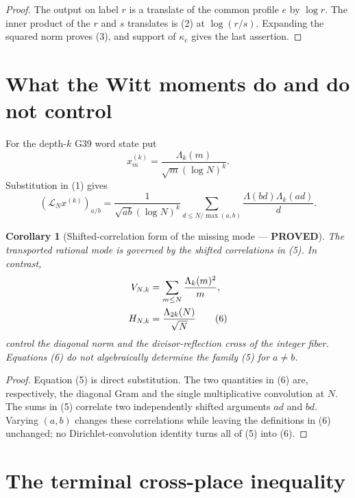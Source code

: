 \documentclass[11pt]{article}
\newcommand{\PROVED}{\textcolor{green!40!black}{\textbf{PROVED}}}
\newtheorem{corollary}{Corollary}
\begin{document}
\begin{proof}
The output on label $r$ is a translate of the common profile $e$ by
$\log r$.  The inner product of the $r$ and $s$ translates is (2) at
$\log(r/s)$.  Expanding the squared norm proves (3), and support of
$\kappa_e$ gives the last assertion.
\end{proof}

\section{What the Witt moments do and do not control}

For the depth-$k$ G39 word state put
\begin{equation}
 x_m^{(k)}=
 \frac{\Lambda_k(m)}{\sqrt m(\log N)^k}.                     \tag{4}
\end{equation}
Substitution in (1) gives
\begin{equation}
 \boxed{
 (\mathcal L_Nx^{(k)})_{a/b}
 =\frac1{\sqrt{ab}(\log N)^k}
 \sum_{d\le N/\max(a,b)}
 \frac{\Lambda(bd)\Lambda_k(ad)}d.}                         \tag{5}
\end{equation}

\begin{corollary}[Shifted-correlation form of the missing mode ---
\PROVED]
The transported rational mode is governed by the shifted correlations in
(5).  In contrast,
\begin{align}
 V_{N,k}&=\sum_{m\le N}\frac{\Lambda_k(m)^2}{m},\notag\\
 H_{N,k}&=\frac{\Lambda_{2k}(N)}{\sqrt N}                    \tag{6}
\end{align}
control the diagonal norm and the divisor-reflection cross of the integer
fiber.  Equations (6) do not algebraically determine the family (5) for
$a\ne b$.
\end{corollary}

\begin{proof}
Equation (5) is direct substitution.  The two quantities in (6) are,
respectively, the diagonal Gram and the single multiplicative convolution
at $N$.  The sums in (5) correlate two independently shifted arguments
$ad$ and $bd$.  Varying $(a,b)$ changes these correlations while leaving
the definitions in (6) unchanged; no Dirichlet-convolution identity turns
all of (5) into (6).
\end{proof}

\section{The terminal cross-place inequality}
\end{document}
